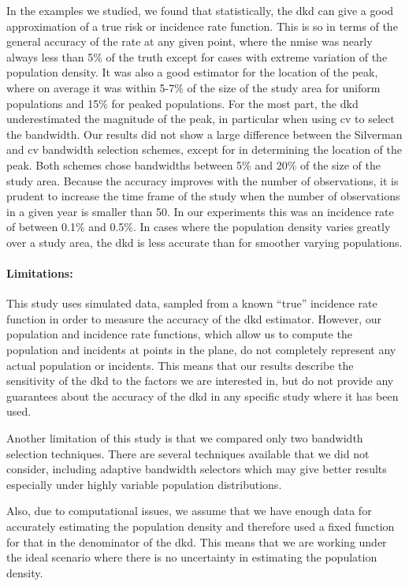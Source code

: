 \begin{onehalfspace}
In the examples we studied,
we found that statistically,
the \acrlong{dkd} can give a good approximation of a true risk or incidence rate function.
This is so in terms of the general accuracy of the rate at any given point,
where the \acrlong{nmise} was nearly always less than 5\% of the truth except for cases with extreme variation of the population density.
It was also a good estimator for the location of the peak,
where on average it was within 5-7\% of the size of the study area for uniform populations and 15\% for peaked populations.
For the most part,
the \acrlong{dkd} underestimated the magnitude of the peak,
in particular when using \acrlong{cv} to select the bandwidth. 
Our results did not show a large difference between the Silverman and \acrlong{cv} bandwidth selection schemes,
except for in determining the location of the peak.
Both schemes chose bandwidths between 5\% and 20\% of the size of the study area.
Because the accuracy improves with the number of observations,
it is prudent to increase the time frame of the study when the number of observations in a given year is smaller than 50.
In our experiments this was an incidence rate of between 0.1\% and 0.5\%.
In cases where the population density varies greatly over a study area,
the \acrlong{dkd} is less accurate than for smoother varying populations.

\paragraph*{Limitations:}

This study uses simulated data,
sampled from a known ``true'' incidence rate function in order to measure the accuracy of the \acrlong{dkd} estimator.
However,
our population and incidence rate functions,
which allow us to compute the population and incidents at points in the plane,
do not completely represent any actual population or incidents.
This means that our results describe the sensitivity of the \acrlong{dkd} to the factors we are interested in,
but do not provide any guarantees about the accuracy of the \acrlong{dkd} in any specific study where it has been used.

Another limitation of this study is that we compared only two bandwidth selection techniques.
There are several techniques available that we did not consider,
including adaptive bandwidth selectors which may give better results especially under highly variable population distributions.

Also, due to computational issues,
we assume that we have enough data for accurately estimating the population density and therefore used a fixed function for that in the denominator of the \acrlong{dkd}.
This means that we are working under the ideal scenario where there is no uncertainty in estimating the population density.


\end{onehalfspace}